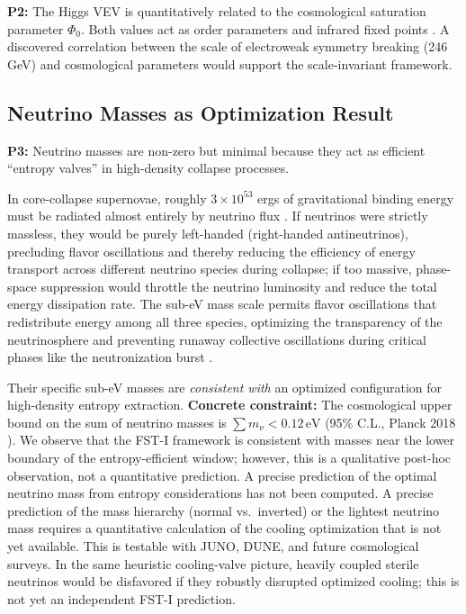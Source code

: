 \documentclass[12pt,a4paper]{article}
\theoremstyle{remark}
\begin{document}
\textbf{P2:} The Higgs VEV is quantitatively related to the cosmological saturation parameter $\Phi_0$. Both values act as order parameters and infrared fixed points \citep{HiggsVEV2024}. A discovered correlation between the scale of electroweak symmetry breaking (246 GeV) and cosmological parameters would support the scale-invariant framework.

\subsection{Neutrino Masses as Optimization Result}

\textbf{P3:} Neutrino masses are non-zero but minimal because they act as efficient ``entropy valves'' in high-density collapse processes.

In core-collapse supernovae, roughly $3 \times 10^{53}$ ergs of gravitational binding energy must be radiated almost entirely by neutrino flux \citep{SupernovaNeutrinos,SupernovaSimulations}. If neutrinos were strictly massless, they would be purely left-handed (right-handed antineutrinos), precluding flavor oscillations and thereby reducing the efficiency of energy transport across different neutrino species during collapse; if too massive, phase-space suppression would throttle the neutrino luminosity and reduce the total energy dissipation rate. The sub-eV mass scale permits flavor oscillations that redistribute energy among all three species, optimizing the transparency of the neutrinosphere and preventing runaway collective oscillations during critical phases like the neutronization burst \citep{NeutrinoOscillations}.

Their specific sub-eV masses are \emph{consistent with} an optimized configuration for high-density entropy extraction. \textbf{Concrete constraint:} The cosmological upper bound on the sum of neutrino masses is $\sum m_\nu < 0.12\,\text{eV}$ (95\% C.L., Planck 2018 \citep{Planck2018}). We observe that the FST-I framework is consistent with masses near the lower boundary of the entropy-efficient window; however, this is a qualitative post-hoc observation, not a quantitative prediction. A precise prediction of the optimal neutrino mass from entropy considerations has not been computed. A precise prediction of the mass hierarchy (normal vs.\ inverted) or the lightest neutrino mass requires a quantitative calculation of the cooling optimization that is not yet available. This is testable with JUNO, DUNE, and future cosmological surveys. In the same heuristic cooling-valve picture, heavily coupled sterile neutrinos would be disfavored if they robustly disrupted optimized cooling; this is not yet an independent FST-I prediction.
\end{document}
